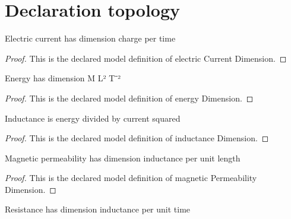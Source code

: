 \section{Declaration topology}
\begin{definition}
  \label{def:physics:phyx-mini-0990:phyxminiproblems-problemphyxmini0990-electriccurrentdimension}
  Electric current has dimension charge per time
\end{definition}
\begin{proof}
  This is the declared model definition of electric Current Dimension.
\end{proof}
\begin{definition}
  \label{def:physics:phyx-mini-0990:phyxminiproblems-problemphyxmini0990-energydimension}
  Energy has dimension M L² T⁻²
\end{definition}
\begin{proof}
  This is the declared model definition of energy Dimension.
\end{proof}
\begin{definition}
  \label{def:physics:phyx-mini-0990:phyxminiproblems-problemphyxmini0990-inductancedimension}
  Inductance is energy divided by current squared
\end{definition}
\begin{proof}
  This is the declared model definition of inductance Dimension.
\end{proof}
\begin{definition}
  \label{def:physics:phyx-mini-0990:phyxminiproblems-problemphyxmini0990-magneticpermeabilitydimension}
  Magnetic permeability has dimension inductance per unit length
\end{definition}
\begin{proof}
  This is the declared model definition of magnetic Permeability Dimension.
\end{proof}
\begin{definition}
  \label{def:physics:phyx-mini-0990:phyxminiproblems-problemphyxmini0990-electricalresistancedimension}
  Resistance has dimension inductance per unit time
\end{definition}
